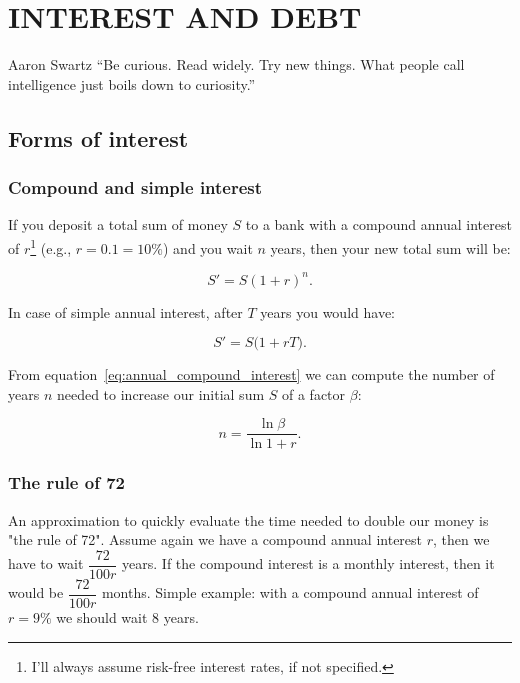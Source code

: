 \chapter{INTEREST AND DEBT}
\begin{chapquote}{Aaron Swartz}
``Be curious. Read widely. Try new things. What people call intelligence just boils down to curiosity.''
\end{chapquote}

\section{Forms of interest}
\subsection{Compound and simple interest}
If you deposit a total sum of money $S$ to a bank with a compound annual interest of $r$\footnote{I'll always assume risk-free interest rates, if not specified.} (e.g., $r=0.1=10\%$) and you wait $n$ years, then your new total sum will be:

\begin{equation}\label{eq:annual_compound_interest}
S' = S(1+r)^n .
\end{equation}

In case of simple annual interest, after $T$ years you would have:

\begin{equation}\label{eq:annual_simple_interest}
S' = S\big(1+rT\big) .
\end{equation}

From equation~\ref{eq:annual_compound_interest} we can compute the number of years $n$ needed to increase our initial sum $S$ of a factor $\beta$:

\begin{equation}\label{eq:time_to_double}
n = \dfrac{\ln{\beta}}{\ln{1+r}}.
\end{equation}

\subsection{The rule of 72}
An approximation to quickly evaluate the time needed to double our money is "the rule of 72". Assume again we have a compound annual interest $r$, then we have to wait $\dfrac{72}{100r}$ years. If the compound interest is a monthly interest, then it would be $\dfrac{72}{100r}$ months. Simple example: with a compound annual interest of $r=9\%$ we should wait 8 years.

